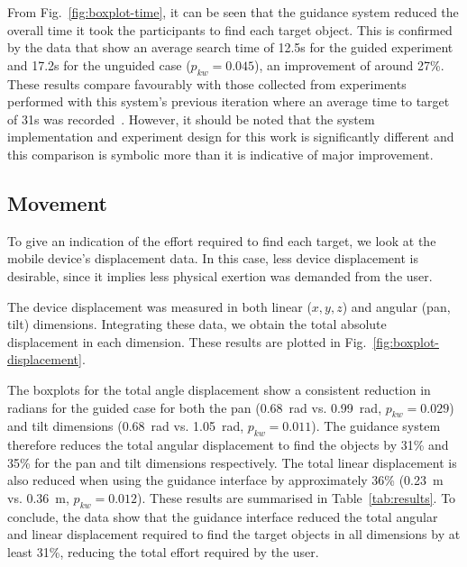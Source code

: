 \documentclass[runningheads]{llncs}
\DeclareRobustCommand{\tofix}[1]{{\sethlcolor{yellow}\hl{[#1]}}}
\begin{document}
From Fig.~\ref{fig:boxplot-time}, it can be seen that the guidance system reduced the overall time it took the participants to find each target object.
This is confirmed by the data that show an average search time of 12.5s for the guided experiment and 17.2s for the unguided case ($p_{kw}=0.045$), an improvement of around 27\%.
These results compare favourably with those collected from experiments performed with this system's previous iteration where an average time to target of 31s was recorded~\cite{lock2019active}. 
However, it should be noted that the system implementation and experiment design for this work is significantly different and this comparison is symbolic more than it is indicative of major improvement.

\subsection{Movement}

To give an indication of the effort required to find each target, we look at the mobile device's displacement data. 
In this case, less device displacement is desirable, since it implies less physical exertion was demanded from the user.

The device displacement was measured in both linear ($x, y, z$) and angular (pan, tilt) dimensions.
Integrating these data, we obtain the total absolute displacement in each dimension.
These results are plotted in Fig.~\ref{fig:boxplot-displacement}.


The boxplots for the total angle displacement show a consistent reduction in radians for the guided case for both the pan (\SI{0.68}{\radian} vs. \SI{0.99}{\radian}, $p_{kw}=0.029$) and tilt dimensions (\SI{0.68}{\radian} vs. \SI{1.05}{\radian}, $p_{kw}=0.011$). 
The guidance system therefore reduces the total angular displacement to find the objects by 31\% and 35\% for the pan and tilt dimensions respectively. 
The total linear displacement is also reduced when using the guidance interface by approximately 36\% (\SI{0.23}{\metre} vs. \SI{0.36}{\metre}, $p_{kw}=0.012$).
These results are summarised in Table~\ref{tab:results}.
To conclude, the data show that the guidance interface reduced the total angular and linear displacement required to find the target objects in all dimensions by at least 31\%, reducing the total effort required by the user. 
\end{document}
